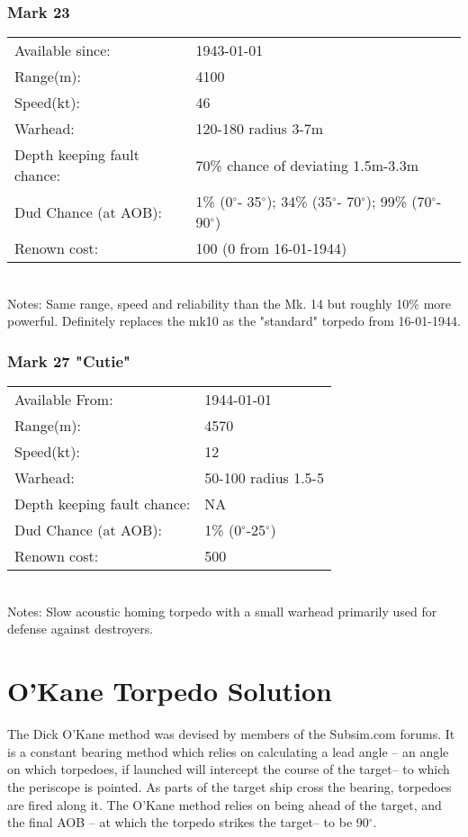 \documentclass{article}
\newcommand{\degree}{$^{\circ}$}
\begin{document}
\subsubsection{Mark 23}
\begin{tabular}{l|l}
Available since:& 1943-01-01\\
Range(m):& 4100\\
Speed(kt):&46\\
Warhead:& 120-180 radius 3-7m\\
Depth keeping fault chance:& 70\% chance of deviating 1.5m-3.3m\\
Dud Chance (at AOB):& 1\% (0\degree - 35\degree); 34\% (35\degree- 70\degree); 99\% (70\degree- 90\degree)\\
Renown cost:&  100 (0 from 16-01-1944)\\
\end{tabular} \\
Notes: Same range, speed and reliability than the Mk. 14 but roughly 10\% more powerful. Definitely replaces the mk10 as the "standard" torpedo from 16-01-1944.

\subsubsection{Mark 27 "Cutie"}
\begin{tabular}{l|l}
Available From:& 1944-01-01\\
Range(m):& 4570\\
Speed(kt):&12\\
Warhead:& 50-100 radius 1.5-5\\
Depth keeping fault chance:& NA\\
Dud Chance (at AOB):& 1\% (0\degree-25\degree)\\
Renown cost:& 500\\
\end{tabular} \\
Notes: Slow acoustic homing torpedo with a small warhead primarily used for defense against destroyers.




\section{O'Kane Torpedo Solution}
The Dick O'Kane method was devised by members of the Subsim.com forums. It is a constant bearing method which relies on calculating a lead angle -- an angle on which torpedoes, if launched will intercept the course of the target-- to which the periscope is pointed. As parts of the target ship cross the bearing, torpedoes are fired along it. The O'Kane method relies on being ahead of the target, and the final AOB -- at which the torpedo strikes the target-- to be 90\degree .
\end{document}
